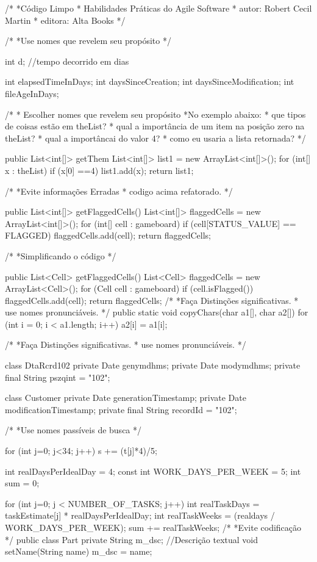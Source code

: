 /*
*Código Limpo
*	Habilidades Práticas do Agile Software
*	autor: Robert Cecil Martin
*	editora: Alta Books
*/

/*
*Use nomes que revelem seu propósito
*/

int d; //tempo decorrido em dias

int elapsedTimeInDays;
int daysSinceCreation;
int daysSinceModification;
int fileAgeInDays;

/*
* Escolher nomes que revelem seu propósito
*No exemplo abaixo:
* que tipos de coisas estão em theList?
* qual a importância de um item na posição zero na theList?
* qual a importâncai do valor 4?
* como eu usaria a lista retornada?
*/

public List<int[]> getThem {
	List<int[]> list1 = new ArrayList<int[]>();
	for (int[] x : theList)
		if (x[0] ==4)
			list1.add(x);
	return list1;
}

/*
*Evite informações Erradas
* codigo acima refatorado.
*/

public List<int[]> getFlaggedCells(){
	List<int[]> flaggedCells = new ArrayList<int[]>();
	for (int[] cell : gameboard)
		if (cell[STATUS_VALUE] == FLAGGED)
			flaggedCells.add(cell);
	return flaggedCells;
}

/*
*Simplificando o código
*/

public List<Cell> getFlaggedCells(){
	List<Cell> flaggedCells = new ArrayList<Cell>();
	for (Cell cell : gameboard)
			if (cell.isFlagged())
				flaggedCells.add(cell);
	return flaggedCells;		
}
/*
*Faça Distinções significativas.
*	use nomes pronunciáveis.
*/
public static void copyChars(char a1[], char a2[]){
	for (int i = 0; i < a1.length; i++){
		a2[i] = a1[i];
	}
}

/*
*Faça Distinções significativas.
*	use nomes pronunciáveis.
*/

class DtaRcrd102 {
	private Date genymdhms;
	private Date modymdhms;
	private final String pszqint = "102";	
}

class Customer{
	private Date generationTimestamp;
	private Date modificationTimestamp;
	private final String recordId = "102";
}

/*
*Use nomes passíveis de busca
*/

for (int j=0; j<34; j++){
	s += (t[j]*4)/5;
}

int realDaysPerIdealDay = 4;
const int WORK_DAYS_PER_WEEK = 5;
int sum = 0;

for (int j=0; j < NUMBER_OF_TASKS; j++){
	int realTaskDays = taskEstimate[j] * realDaysPerIdealDay;
	int realTaskWeeks = (realdays / WORK_DAYS_PER_WEEK);
	sum += realTaskWeeks;
}
/*
*Evite codificação
*/
public class Part {
	private String m_dsc; //Descrição textual
	void setName(String name){
		m_dsc = name;
	}
}

